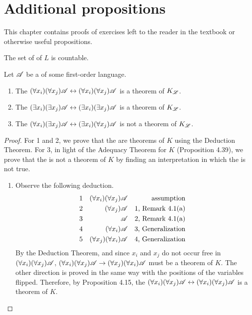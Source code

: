 \chapter{Additional propositions}

This chapter contains proofs of exercises left to the reader in the textbook or otherwise useful propositions.

\begin{proposition}
  The set of \wfs{} of \(L\) is countable.
\end{proposition}

\begin{proposition}
  Let \(\mathscr{A}\) be a \wf{} of some first-order language. 
  \begin{enumerate}
    \item The \wf{} \((\forall x_i)(\forall x_j)\mathscr{A} \leftrightarrow (\forall x_i)(\forall x_j)\mathscr{A}\) is a theorem of \(K_{\mathscr{L}}\).
    \item The \wf{} \((\exists x_i)(\exists x_j)\mathscr{A} \leftrightarrow (\exists x_i)(\exists x_j)\mathscr{A}\) is a theorem of \(K_{\mathscr{L}}\).
    \item The \wf{} \((\forall x_i)(\exists x_j)\mathscr{A} \leftrightarrow (\exists x_i)(\forall x_j)\mathscr{A}\) is not a theorem of \(K_{\mathscr{L}}\).
  \end{enumerate}

  \begin{proof}
    For 1 and 2, we prove that the \wfs{} are theorems of \(K\) using the Deduction Theorem. For 3, in light of the Adequacy Theorem for \(K\) (Proposition 4.39), we prove that the \wf{} is not a theorem of \(K\) by finding an interpretation in which the \wf{} is not true.
    \begin{enumerate}
      \item Observe the following deduction.
        \begin{align*}
          \text{1}&&
          (\forall x_i)(\forall x_j)\mathscr{A}&&
          \text{assumption}\\
          \text{2}&&
          (\forall x_j)\mathscr{A}&&
          \text{1, Remark 4.1(a)}\\
          \text{3}&&
          \mathscr{A}&&
          \text{2, Remark 4.1(a)}\\
          \text{4}&&
          (\forall x_i)\mathscr{A}&&
          \text{3, Generalization}\\
          \text{5}&&
          (\forall x_j)(\forall x_i)\mathscr{A}&&
          \text{4, Generalization}
        \end{align*}
        By the Deduction Theorem, and since \(x_i\) and \(x_j\) do not occur free in \((\forall x_i)(\forall x_j)\mathscr{A}\), \((\forall x_i)(\forall x_j)\mathscr{A} \rightarrow (\forall x_j)(\forall x_i)\mathscr{A}\) must be a theorem of \(K\). The other direction is proved in the same way with the positions of the variables flipped. Therefore, by Proposition 4.15, the \wf{} \((\forall x_i)(\forall x_j)\mathscr{A} \leftrightarrow (\forall x_i)(\forall x_j)\mathscr{A}\) is a theorem of \(K\).


\end{enumerate}
\end{proof}
\end{proposition}
